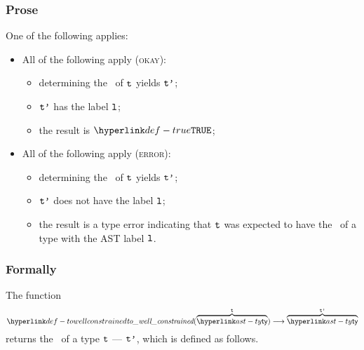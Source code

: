 \subsubsection{Prose}
One of the following applies:
\begin{itemize}
  \item All of the following apply (\textsc{okay}):
  \begin{itemize}
    \item determining the \structure\ of $\texttt{t}$ yields $\texttt{t'}$\ProseOrTypeError;
    \item $\texttt{t'}$ has the label $\texttt{l}$;
    \item the result is $\True$;
  \end{itemize}

  \item All of the following apply (\textsc{error}):
  \begin{itemize}
    \item determining the \structure\ of $\texttt{t}$ yields $\texttt{t'}$\ProseOrTypeError;
    \item $\texttt{t'}$ does not have the label $\texttt{l}$;
    \item the result is a type error indicating that $\texttt{t}$ was expected to have the \structure\ of a type with the AST label $\texttt{l}$.
  \end{itemize}
\end{itemize}

\subsubsection{Formally}

\hypertarget{def-towellconstrained}{}
The function
\[
  \towellconstrained(\overname{\ty}{\vt}) \aslto \overname{\ty}{\vtp}
\]
returns the \wellconstrainedversion\ of a type $\texttt{t}$ --- $\texttt{t'}$, which is defined as follows.

